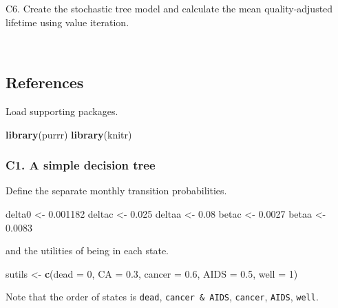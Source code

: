 \documentclass[]{book}
\newenvironment{Shaded}{\begin{snugshade}}{\end{snugshade}}
\newcommand{\DataTypeTok}[1]{\textcolor[rgb]{0.13,0.29,0.53}{#1}}
\newcommand{\DecValTok}[1]{\textcolor[rgb]{0.00,0.00,0.81}{#1}}
\newcommand{\FloatTok}[1]{\textcolor[rgb]{0.00,0.00,0.81}{#1}}
\newcommand{\KeywordTok}[1]{\textcolor[rgb]{0.13,0.29,0.53}{\textbf{#1}}}
\newcommand{\NormalTok}[1]{#1}
\newcommand{\StringTok}[1]{\textcolor[rgb]{0.31,0.60,0.02}{#1}}
\begin{document}
C6. Create the stochastic tree model and calculate the mean quality-adjusted lifetime using value iteration.

~

\hypertarget{references}{%
\subsection{References}\label{references}}

Load supporting packages.

\begin{Shaded}
\begin{Highlighting}[]
\KeywordTok{library}\NormalTok{(purrr)}
\KeywordTok{library}\NormalTok{(knitr)}
\end{Highlighting}
\end{Shaded}

\hypertarget{c1.-a-simple-decision-tree}{%
\subsubsection{C1. A simple decision tree}\label{c1.-a-simple-decision-tree}}

Define the separate monthly transition probabilities.

\begin{Shaded}
\begin{Highlighting}[]
\NormalTok{delta0 <-}\StringTok{ }\FloatTok{0.001182}
\NormalTok{deltac <-}\StringTok{ }\FloatTok{0.025}
\NormalTok{deltaa <-}\StringTok{ }\FloatTok{0.08}
\NormalTok{betac  <-}\StringTok{ }\FloatTok{0.0027}
\NormalTok{betaa  <-}\StringTok{ }\FloatTok{0.0083}
\end{Highlighting}
\end{Shaded}

and the utilities of being in each state.

\begin{Shaded}
\begin{Highlighting}[]
\NormalTok{sutils <-}\StringTok{ }\KeywordTok{c}\NormalTok{(}\DataTypeTok{dead =} \DecValTok{0}\NormalTok{, }\DataTypeTok{CA =} \FloatTok{0.3}\NormalTok{, }\DataTypeTok{cancer =} \FloatTok{0.6}\NormalTok{, }\DataTypeTok{AIDS =} \FloatTok{0.5}\NormalTok{, }\DataTypeTok{well =} \DecValTok{1}\NormalTok{)}
\end{Highlighting}
\end{Shaded}

Note that the order of states is \texttt{dead}, \texttt{cancer\ \&\ AIDS}, \texttt{cancer}, \texttt{AIDS}, \texttt{well}.
\end{document}
